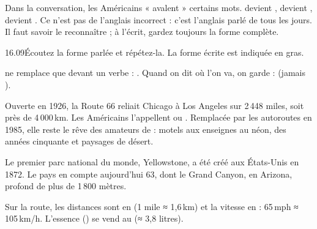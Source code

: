 Dans la conversation, les Américains « avalent » certains mots.  devient 
,  devient  ,  devient 
. Ce n'est pas de l'anglais incorrect : c'est l'anglais parlé de tous les jours. Il
faut savoir le reconnaître ; à l'écrit, gardez toujours la forme complète.

\begin{phrases}{16.09}{Écoutez la forme parlée et répétez-la. La forme écrite est indiquée en gras.}
\end{phrases}

\begin{attention}
 ne remplace  que devant un verbe : . Quand on dit où l'on
va, on garde  :  (jamais ).
\end{attention}


\begin{culture}[La Route 66]
Ouverte en 1926, la Route 66 reliait Chicago à Los Angeles sur 2\,448 miles, soit près de
4\,000\,km. Les Américains l'appellent  ou .
Remplacée par les autoroutes en 1985, elle reste le rêve des amateurs de  : motels aux
enseignes au néon,  des années cinquante et paysages de désert.
\end{culture}

\begin{paire}
\begin{culture}
Le premier parc national du monde, Yellowstone, a été créé aux États-Unis en 1872. Le pays en compte
aujourd'hui 63, dont le Grand Canyon, en Arizona, profond de plus de 1\,800 mètres.
\end{culture}
\begin{culture}
Sur la route, les distances sont en  (1 mile ≈ 1,6\,km) et la vitesse en  : 65\,mph ≈ 105\,km/h. L'essence () se vend au  (≈ 3,8 litres).
\end{culture}
\end{paire}

